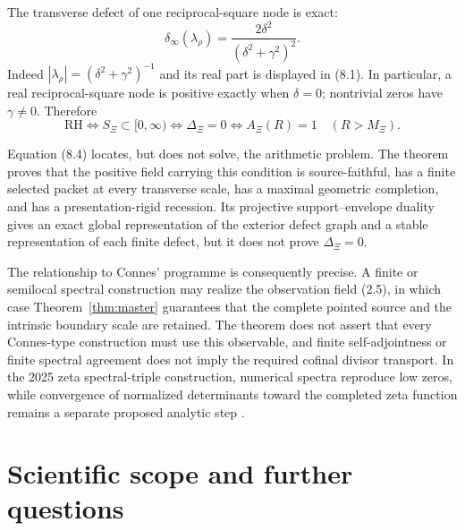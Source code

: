 \documentclass[11pt]{article}
\theoremstyle{remark}
\newcommand{\RH}{\mathrm{RH}}
\begin{document}
The transverse defect of one reciprocal-square node is exact:
\begin{equation}
 \delta_\infty(\lambda_\rho)
 =\frac{2\delta^2}{(\delta^2+\gamma^2)^2}.
 \tag{8.3}
\end{equation}
Indeed $|\lambda_\rho|=(\delta^2+\gamma^2)^{-1}$ and its real part is displayed in (8.1).
In particular, a real reciprocal-square node is positive exactly when $\delta=0$; nontrivial
zeros have $\gamma\ne0$.  Therefore
\begin{equation}
 \RH\Longleftrightarrow S_\Xi\subset[0,\infty)
 \Longleftrightarrow\Delta_\Xi=0
 \Longleftrightarrow A_\Xi(R)=1\quad(R>M_\Xi).
 \tag{8.4}
\end{equation}

Equation (8.4) locates, but does not solve, the arithmetic problem.  The theorem proves that the
positive field carrying this condition is source-faithful, has a finite selected packet at every
transverse scale, has a maximal geometric completion, and has a presentation-rigid recession.
Its projective support--envelope duality gives an exact global representation of the exterior
defect graph and a stable representation of each finite defect, but it does not prove
$\Delta_\Xi=0$.

The relationship to Connes' programme is consequently precise.  A finite or semilocal spectral
construction may realize the observation field (2.5), in which case Theorem~\ref{thm:master}
guarantees that the complete pointed source and the intrinsic boundary scale are retained.  The
theorem does not assert that every Connes-type construction must use this observable, and finite
self-adjointness or finite spectral agreement does not imply the required cofinal divisor
transport.  In the 2025 zeta spectral-triple construction, numerical spectra reproduce low zeros,
while convergence of normalized determinants toward the completed zeta function remains a
separate proposed analytic step \cite{ConnesConsaniMoscovici2025}.

\section{Scientific scope and further questions}
\end{document}
